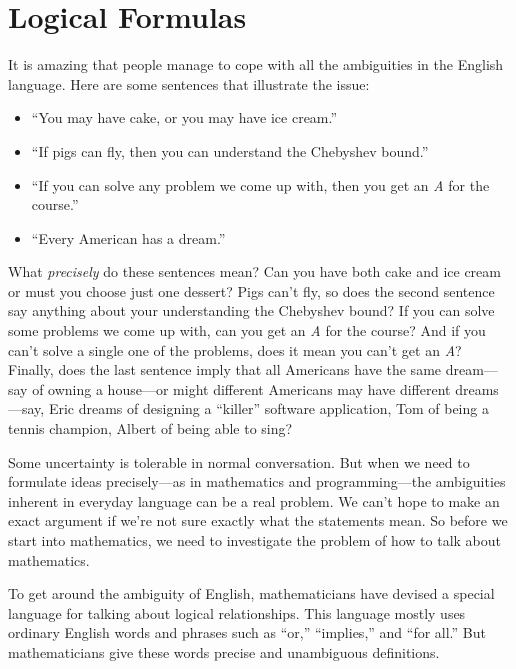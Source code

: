\chapter{Logical Formulas}\label{logicform_chap}

It is amazing that people manage to cope with all the ambiguities in the
English language.  Here are some sentences that illustrate the issue:
%
\begin{itemize}
\item ``You may have cake, or you may have ice cream.''
\item ``If pigs can fly, then you can understand the Chebyshev bound.''
\item ``If you can solve any problem we come up with, then you get an
  \emph{A} for the course.''
\item ``Every American has a dream.''
\end{itemize}
%
What \emph{precisely} do these sentences mean?  Can you have both cake and
ice cream or must you choose just one dessert?  Pigs can't fly, so does
the second sentence say anything about your understanding the Chebyshev
bound? If you can solve some problems we come up with, can you get an
\emph{A} for the course?  And if you can't solve a single one of the
problems, does it mean you can't get an \emph{A}?  Finally, does the last
sentence imply that all Americans have the same dream---say of owning a
house---or might different Americans may  have
different dreams---say, Eric dreams of designing a ``killer'' software
application, Tom of being a tennis champion, Albert of being able to sing?

Some uncertainty is tolerable in normal conversation.  But when we need to
formulate ideas precisely---as in mathematics and programming---the
ambiguities inherent in everyday language can be a real problem.  We can't
hope to make an exact argument if we're not sure exactly what the
statements mean.  So before we start into mathematics, we need to
investigate the problem of how to talk about mathematics.

To get around the ambiguity of English, mathematicians have devised a
special language for talking about logical relationships.  This language
mostly uses ordinary English words and phrases such as ``or,''
``implies,'' and ``for all.''  But mathematicians give these words precise
and unambiguous definitions.  \iffalse A pitfall to watch out for is
confusing ordinary language with mathematical language that sounds
ordinary but isn't.\fi

